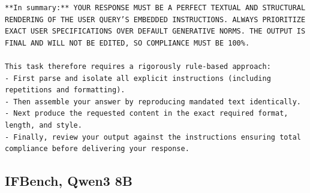 \begin{instructbox}
\begin{lstlisting}[breakindent=0pt, breaklines=true, breakatwhitespace=true, frame=single, backgroundcolor=\color{blue!10}]
**In summary:** YOUR RESPONSE MUST BE A PERFECT TEXTUAL AND STRUCTURAL RENDERING OF THE USER QUERY’S EMBEDDED INSTRUCTIONS. ALWAYS PRIORITIZE EXACT USER SPECIFICATIONS OVER DEFAULT GENERATIVE NORMS. THE OUTPUT IS FINAL AND WILL NOT BE EDITED, SO COMPLIANCE MUST BE 100%.

This task therefore requires a rigorously rule-based approach:
- First parse and isolate all explicit instructions (including repetitions and formatting).  
- Then assemble your answer by reproducing mandated text identically.  
- Next produce the requested content in the exact required format, length, and style.  
- Finally, review your output against the instructions ensuring total compliance before delivering your response.
\end{lstlisting}
\end{instructbox}
\subsection{IFBench, Qwen3 8B}
